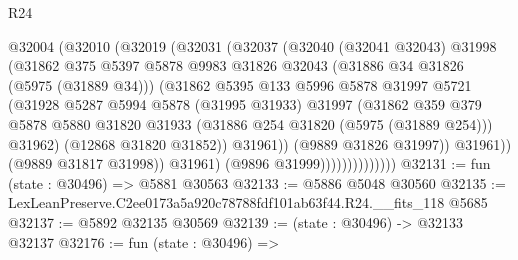 \begin{lexlean}{R24}
\begin{coremodule}
                            @32004
                              (@32010
                                (@32019
                                  (@32031
                                    (@32037
                                      (@32040
                                        (@32041 @32043)
                                        @31998
                                        (@31862
                                          @375
                                          @5397
                                          @5878
                                          @9983
                                          @31826
                                          @32043
                                          (@31886 @34 @31826 (@5975 (@31889 @34)))
                                          (@31862
                                            @5395
                                            @133
                                            @5996
                                            @5878
                                            @31997
                                            @5721
                                            (@31928
                                              @5287
                                              @5994
                                              @5878
                                              (@31995 @31933)
                                              @31997
                                              (@31862
                                                @359
                                                @379
                                                @5878
                                                @5880
                                                @31820
                                                @31933
                                                (@31886 @254 @31820 (@5975 (@31889 @254)))
                                                @31962)
                                              (@12868 @31820 @31852))
                                            @31961))
                                        (@9889 @31826 @31997))
                                      @31961))
                                  (@9889 @31817 @31998))
                                @31961)
                              (@9896 @31999))))))))))))))
@32131 := fun (state : @30496) => @5881 @30563
@32133 := @5886 @5048 @30560
@32135 := LexLeanPreserve.C2ee0173a5a920c78788fdf101ab63f44.R24.__fits_118 @5685
@32137 := @5892 @32135 @30569
@32139 := (state : @30496) -> @32133 @32137
@32176 := fun (state : @30496) =>

\end{coremodule}
\end{lexlean}
